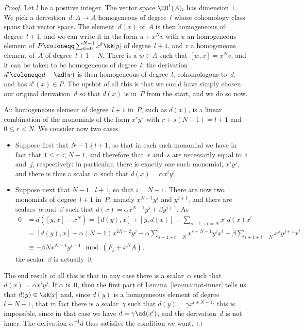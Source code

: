\begin{proof}
Let $l$ be a positive integer. The vector space $\HH^1(A)_l$ has
dimension~$1$. We pick a derivation~$d:A\to A$ homogeneous of degree~$l$
whose cohomology class spans that vector space. The element~$d(x)$ of~$A$
is then homogeneous of degree~$l+1$, and we can write it in the form
$u+x^Nv$ with $u$ an homogeneous element of
$P\coloneqq\sum_{k=0}^{N-1}x^k\kk[y]$ of degree~$l+1$, and $v$ a
homogeneous element of~$A$ of degree~$l+1-N$. There is a $w\in A$ such that
$[w,x]=x^Nv$, and it can be taken to be homogeneous of degree~$l$: the
derivation $d'\coloneqq d-\ad(w)$ is then homogeneous of degree~$l$,
cohomologous to~$d$, and has $d'(x)\in P$. The upshot of all this is that
we could have simply chosen our original derivation~$d$ so that $d(x)$ is
in~$P$ from the start, and we do so now.

An homogeneous element of degree~$l+1$ in~$P$, such as $d(x)$, is a linear
combination of the monomials of the form $x^ry^s$ with $r+s(N-1)=l+1$ and
$0\leq r<N$. We consider now two cases.
\begin{itemize}

\item Suppose first that $N-1\nmid l+1$, so that in each such monomial we
have in fact that $1\leq r<N-1$, and therefore that~$r$ and~$s$ are
necessarily equal to~$i$ and~$j$, respectively: in particular, there is
exactly one such monomial, $x^iy^j$, and there is thus a scalar~$\alpha$
such that $d(x)=\alpha x^iy^j$.

\item Suppose next that $N-1\mid l+1$, so that $i=N-1$. There are
now two monomials of degree~$l+1$ in~$P$, namely $x^{N-1}y^{j}$ and
$y^{j+1}$, and there are scalars~$\alpha$ and~$\beta$ such that $d(x) = \alpha
x^{N-1}y^{j} + \beta y^{j+1}$. As
  \begin{align}
  0 &= d([y,x]-x^N)
     = [d(y),x] + [y,d(x)] - \sum_{s+1+t=N}x^sd(x)x^t \\
    &= [d(y),x] + \alpha(N-1)x^{2N-2}y^{j} 
         - \alpha \sum_{s+1+t=N}x^{s+N-1}y^{j}x^t  
         - \beta\sum_{s+1+t=N}x^sy^{j+1}x^t
       \\
    &\equiv -\beta Nx^{N-1}y^{j+1} \mod(F_{j}+x^NA),
  \end{align}
the scalar~$\beta$ is actually~$0$.
\end{itemize}
The end result of all this is that in any case there is a scalar~$\alpha$
such that $d(x) = \alpha x^iy^j$. If $\alpha$ is~$0$, then the first part
of Lemma~\ref{lemma:not-inner} tells us that $d(y)\in\kk[x]$ and, since
$d(y)$ is a homogeneous element of degree~$l+N-1$, that in fact there is a
scalar~$\gamma$ such that $d(y)=\gamma x^{l+N-1}$: this is impossible,
since in that case we have $d=\gamma\ad(x^l)$, and the derivation~$d$ is
not inner. The derivation $\alpha^{-1}d$ thus satisfies the condition we
want.
\end{proof}

